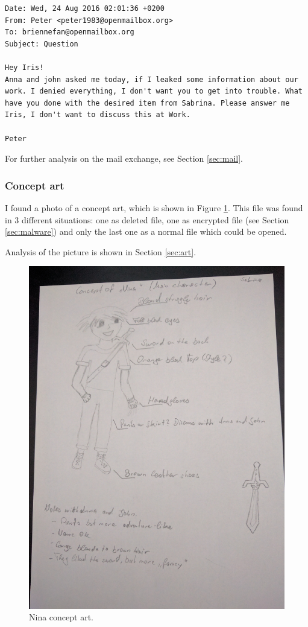 \documentclass[12pt]{article}
\begin{document}
\begin{shaded}
\begin{verbatim}
Date: Wed, 24 Aug 2016 02:01:36 +0200
From: Peter <peter1983@openmailbox.org>
To: briennefan@openmailbox.org
Subject: Question

Hey Iris!
Anna and john asked me today, if I leaked some information about our
work. I denied everything, I don't want you to get into trouble. What
have you done with the desired item from Sabrina. Please answer me
Iris, I don't want to discuss this at Work.

Peter
\end{verbatim}
\end{shaded}
For further analysis on the mail exchange, see Section \ref{sec:mail}.

\subsubsection{Concept art}

I found a photo of a concept art, which is shown in Figure \ref{fig:nina}.
This file was found in 3 different situations: one as deleted file, one as encrypted file (see Section \ref{sec:malware}) and only the last one as a normal file which could be opened.

Analysis of the picture is shown in Section \ref{sec:art}.

\begin{figure}[!ht]
    \centering
    \includegraphics[width=\textwidth]{images/nina_concept.jpg}
    \caption{Nina concept art.}
    \label{fig:nina}
\end{figure}
\end{document}
